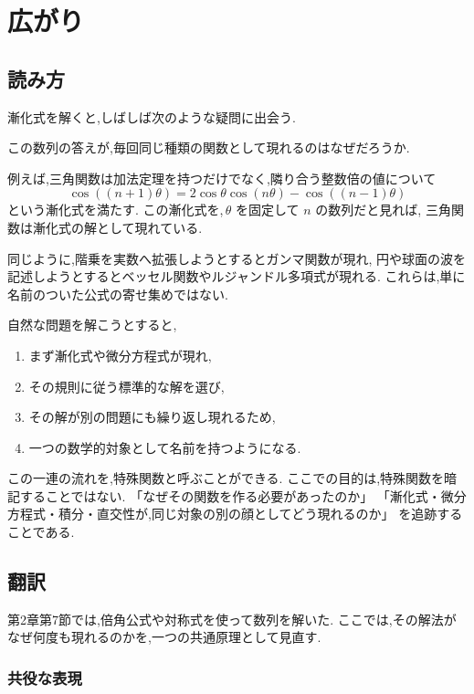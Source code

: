 
\section{広がり}


\subsection*{読み方}

漸化式を解くと,しばしば次のような疑問に出会う.

\begin{mdquote}
  この数列の答えが,毎回同じ種類の関数として現れるのはなぜだろうか.
\end{mdquote}

例えば,三角関数は加法定理を持つだけでなく,隣り合う整数倍の値について
\[
  \cos((n+1)\theta)
  =2\cos\theta\cos(n\theta)-\cos((n-1)\theta)
\]
という漸化式を満たす.
この漸化式を,\,$\theta$ を固定して $n$ の数列だと見れば,
三角関数は漸化式の解として現れている.

同じように,階乗を実数へ拡張しようとするとガンマ関数が現れ,
円や球面の波を記述しようとするとベッセル関数やルジャンドル多項式が現れる.
これらは,単に名前のついた公式の寄せ集めではない.

自然な問題を解こうとすると,
\begin{enumerate}
  \item まず漸化式や微分方程式が現れ,
  \item その規則に従う標準的な解を選び,
  \item その解が別の問題にも繰り返し現れるため,
  \item 一つの数学的対象として名前を持つようになる.
\end{enumerate}

この一連の流れを,特殊関数と呼ぶことができる.
ここでの目的は,特殊関数を暗記することではない.
「なぜその関数を作る必要があったのか」
「漸化式・微分方程式・積分・直交性が,同じ対象の別の顔としてどう現れるのか」
を追跡することである.

\subsection{翻訳}

第2章第7節では,倍角公式や対称式を使って数列を解いた.
ここでは,その解法がなぜ何度も現れるのかを,一つの共通原理として見直す.

\subsubsection{共役な表現}

